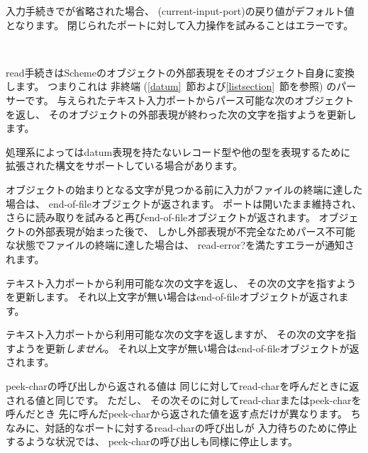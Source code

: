 入力手続きでが省略された場合、
{\cf (current-input-port)}の戻り値がデフォルト値となります。
閉じられたポートに対して入力操作を試みることはエラーです。

\noindent \hbox{ }  %
\vspace{-5ex}


\begin{entry}{%
}

{\cf read}手続きはSchemeのオブジェクトの外部表現をそのオブジェクト自身に変換します。
つまりこれは
非終端 (\ref{datum}~節および\ref{listsection}~節を参照)
のパーサーです。
与えられたテキスト入力ポートからパース可能な次のオブジェクトを返し、
そのオブジェクトの外部表現が終わった次の文字を指すようを更新します。

処理系によってはdatum表現を持たないレコード型や他の型を表現するために
拡張された構文をサポートしている場合があります。

\vest オブジェクトの始まりとなる文字が見つかる前に入力がファイルの終端に達した場合は、
end-of-fileオブジェクトが返されます。
ポートは開いたまま維持され、
さらに読み取りを試みると再びend-of-fileオブジェクトが返されます。
オブジェクトの外部表現が始まった後で、
しかし外部表現が不完全なためパース不可能な状態でファイルの終端に達した場合は、
{\cf read-error?}を満たすエラーが通知されます。

\end{entry}

\begin{entry}{%
}

テキスト入力ポートから利用可能な次の文字を返し、
その次の文字を指すようを更新します。
それ以上文字が無い場合はend-of-fileオブジェクトが返されます。

\end{entry}


\begin{entry}{%
}

テキスト入力ポートから利用可能な次の文字を返しますが、
その次の文字を指すようを更新{\em しません}。
それ以上文字が無い場合はend-of-fileオブジェクトが返されます。

\begin{note}
{\cf peek-char}の呼び出しから返される値は
同じに対して{\cf read-char}を呼んだときに返される値と同じです。
ただし、
その次そのに対して{\cf read-char}または{\cf peek-char}を呼んだとき
先に呼んだ{\cf peek-char}から返された値を返す点だけが異なります。
ちなみに、対話的なポートに対する{\cf read-char}の呼び出しが
入力待ちのために停止するような状況では、
{\cf peek-char}の呼び出しも同様に停止します。
\end{note}

\end{entry}

